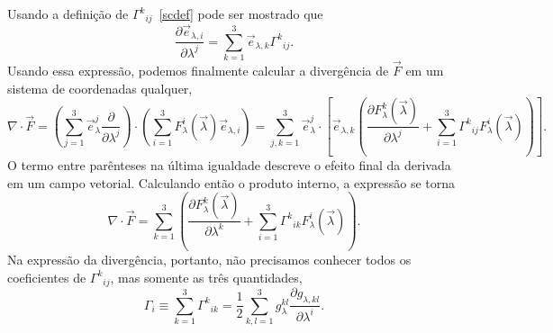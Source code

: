 Usando a definição de $\Gamma^{k}{}_{ij}$~\eqref{scdef} pode ser mostrado que
\begin{equation}
	\frac{\partial \vec{e}_{\lambda,i}}{\partial\lambda^j} = \sum_{k=1}^3\vec{e}_{\lambda,k}\Gamma^k{}_{ij}.
\end{equation}
Usando essa expressão, podemos finalmente calcular a divergência de $\vec{F}$ em
um sistema de coordenadas qualquer,
\begin{equation}\label{divcurv}
	\nabla\cdot\vec{F} = \left(\sum_{j=1}^3\vec{e}_\lambda^j\frac{\partial }{\partial \lambda^j}\right)\cdot\left(\sum_{i=1}^3F_\lambda^i(\vec{\lambda})\vec{e}_{\lambda,i}\right) = \sum_{j,k=1}^3\vec{e}_\lambda^j\cdot \left[\vec{e}_{\lambda,k}\left(\frac{\partial F_\lambda^k(\vec{\lambda})}{\partial \lambda^j}+\sum_{i=1}^3\Gamma^{k}{}_{ij}F_\lambda^i(\vec{\lambda})\right)\right].
\end{equation}
O termo entre parênteses na última igualdade descreve o efeito final da derivada
em um campo vetorial. Calculando então o produto interno, a expressão se torna
\begin{equation}\label{div0}
	\nabla\cdot\vec{F} = \sum_{k=1}^3\left(\frac{\partial F_\lambda^k(\vec{\lambda})}{\partial \lambda^k}+\sum_{i=1}^3\Gamma^{k}{}_{ik}F_\lambda^i(\vec{\lambda})\right).
\end{equation}
Na expressão da divergência, portanto, não precisamos conhecer todos os
coeficientes de $\Gamma^k{}_{ij}$, mas somente as três quantidades,
\begin{equation}
	\Gamma_i \equiv \sum_{k=1}^3\Gamma^{k}{}_{ik} = \frac{1}{2} \sum_{k,l=1}^3g_\lambda^{kl}\frac{\partial g_{\lambda,kl}}{\partial\lambda^i}.
\end{equation}

